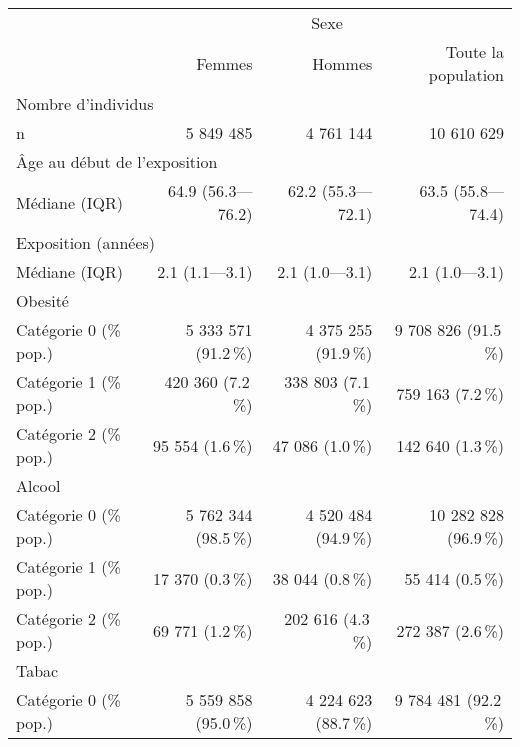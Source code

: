 \begin{longtable}{l|rrr}
\toprule
\multicolumn{1}{l}{} & \multicolumn{3}{c}{Sexe} \\ 
\cmidrule(lr){2-4}
\multicolumn{1}{l}{} & Femmes & Hommes & Toute la population \\ 
\midrule
\multicolumn{4}{l}{Nombre d'individus} \\ 
\midrule
\hspace*{25px} n & 5 849 485 & 4 761 144 & 10 610 629 \\ 
\midrule
\multicolumn{4}{l}{Âge au début de l'exposition} \\ 
\midrule
\hspace*{25px} Médiane (IQR) & 64.9 (56.3—76.2) & 62.2 (55.3—72.1) & 63.5 (55.8—74.4) \\ 
\midrule
\multicolumn{4}{l}{Exposition (années)} \\ 
\midrule
\hspace*{25px} Médiane (IQR) & 2.1 (1.1—3.1) & 2.1 (1.0—3.1) & 2.1 (1.0—3.1) \\ 
\midrule
\multicolumn{4}{l}{Obesité} \\ 
\midrule
\hspace*{25px} Catégorie 0 (\% pop.) & 5 333 571 (91.2\,\%) & 4 375 255 (91.9\,\%) & 9 708 826 (91.5\,\%) \\ 
\hspace*{25px} Catégorie 1 (\% pop.) & 420 360 (7.2\,\%) & 338 803 (7.1\,\%) & 759 163 (7.2\,\%) \\ 
\hspace*{25px} Catégorie 2 (\% pop.) & 95 554 (1.6\,\%) & 47 086 (1.0\,\%) & 142 640 (1.3\,\%) \\ 
\midrule
\multicolumn{4}{l}{Alcool} \\ 
\midrule
\hspace*{25px} Catégorie 0 (\% pop.) & 5 762 344 (98.5\,\%) & 4 520 484 (94.9\,\%) & 10 282 828 (96.9\,\%) \\ 
\hspace*{25px} Catégorie 1 (\% pop.) & 17 370 (0.3\,\%) & 38 044 (0.8\,\%) & 55 414 (0.5\,\%) \\ 
\hspace*{25px} Catégorie 2 (\% pop.) & 69 771 (1.2\,\%) & 202 616 (4.3\,\%) & 272 387 (2.6\,\%) \\ 
\midrule
\multicolumn{4}{l}{Tabac} \\ 
\midrule
\hspace*{25px} Catégorie 0 (\% pop.) & 5 559 858 (95.0\,\%) & 4 224 623 (88.7\,\%) & 9 784 481 (92.2\,\%) \\ 

\end{longtable}
